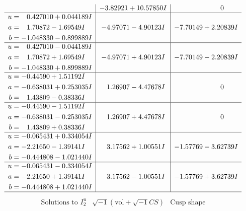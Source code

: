 \documentclass[1p]{elsarticle_modified}
\theoremstyle{definition}
\newcommand{\I}{\sqrt{-1}}
\begin{document}
$$\begin{array}{c|c|c}
 & -3.82921 + 10.57850 I & \phantom{-0.000000 } 0 \\ \hline\begin{aligned}
u &= \phantom{-}0.427010 + 0.044189 I \\
a &= \phantom{-}1.70872 - 1.69549 I \\
b &= -1.048330 - 0.899889 I\end{aligned}
 & -4.97071 - 4.90123 I & -7.70149 + 2.20839 I \\ \hline\begin{aligned}
u &= \phantom{-}0.427010 - 0.044189 I \\
a &= \phantom{-}1.70872 + 1.69549 I \\
b &= -1.048330 + 0.899889 I\end{aligned}
 & -4.97071 + 4.90123 I & -7.70149 - 2.20839 I \\ \hline\begin{aligned}
u &= -0.44590 + 1.51192 I \\
a &= -0.638031 + 0.253035 I \\
b &= \phantom{-}1.43809 - 0.38336 I\end{aligned}
 & \phantom{-}1.26907 - 4.47678 I & \phantom{-0.000000 } 0 \\ \hline\begin{aligned}
u &= -0.44590 - 1.51192 I \\
a &= -0.638031 - 0.253035 I \\
b &= \phantom{-}1.43809 + 0.38336 I\end{aligned}
 & \phantom{-}1.26907 + 4.47678 I & \phantom{-0.000000 } 0 \\ \hline\begin{aligned}
u &= -0.065431 + 0.334054 I \\
a &= -2.21650 - 1.39141 I \\
b &= -0.444808 - 1.021440 I\end{aligned}
 & \phantom{-}3.17562 + 1.00551 I & -1.57769 - 3.62739 I \\ \hline\begin{aligned}
u &= -0.065431 - 0.334054 I \\
a &= -2.21650 + 1.39141 I \\
b &= -0.444808 + 1.021440 I\end{aligned}
 & \phantom{-}3.17562 - 1.00551 I & -1.57769 + 3.62739 I\\
 \hline 
 \end{array}$$\newpage$$\begin{array}{c|c|c}  
\text{Solutions to }I^u_{2}& \I (\text{vol} + \sqrt{-1}CS) & \text{Cusp shape}\\

\end{array}$$
\end{document}
